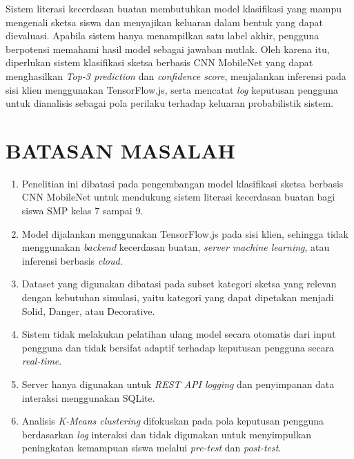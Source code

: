 \documentclass[10pt,twoside,openright]{report}
\begin{document}
Sistem literasi kecerdasan buatan membutuhkan model klasifikasi yang mampu mengenali sketsa siswa dan menyajikan keluaran dalam bentuk yang dapat dievaluasi. Apabila sistem hanya menampilkan satu label akhir, pengguna berpotensi memahami hasil model sebagai jawaban mutlak. Oleh karena itu, diperlukan sistem klasifikasi sketsa berbasis CNN MobileNet yang dapat menghasilkan \textit{Top-3 prediction} dan \textit{confidence score}, menjalankan inferensi pada sisi klien menggunakan TensorFlow.js, serta mencatat \textit{log} keputusan pengguna untuk dianalisis sebagai pola perilaku terhadap keluaran probabilistik sistem.

\section{BATASAN MASALAH}
\label{sec:batasan-masalah}

\begin{enumerate}
    \item Penelitian ini dibatasi pada pengembangan model klasifikasi sketsa berbasis CNN MobileNet untuk mendukung sistem literasi kecerdasan buatan bagi siswa SMP kelas 7 sampai 9.
    \item Model dijalankan menggunakan TensorFlow.js pada sisi klien, sehingga tidak menggunakan \textit{backend} kecerdasan buatan, \textit{server machine learning}, atau inferensi berbasis \textit{cloud}.
    \item Dataset yang digunakan dibatasi pada subset kategori sketsa yang relevan dengan kebutuhan simulasi, yaitu kategori yang dapat dipetakan menjadi Solid, Danger, atau Decorative.
    \item Sistem tidak melakukan pelatihan ulang model secara otomatis dari input pengguna dan tidak bersifat adaptif terhadap keputusan pengguna secara \textit{real-time}.
    \item Server hanya digunakan untuk \textit{REST API logging} dan penyimpanan data interaksi menggunakan SQLite.
    \item Analisis \textit{K-Means clustering} difokuskan pada pola keputusan pengguna berdasarkan \textit{log} interaksi dan tidak digunakan untuk menyimpulkan peningkatan kemampuan siswa melalui \textit{pre-test} dan \textit{post-test}.
\end{enumerate}

\end{document}

